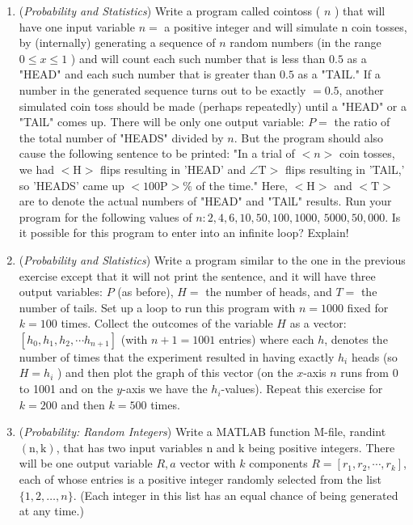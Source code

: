 \documentclass[../main.tex]{subfiles}
\begin{document}
\begin{enumerate}
 \item (\emph{Probability and Statistics}) Write a program called cointoss ( $n$ ) that will have one input variable $n=$ a positive integer and will simulate $\mathrm{n}$ coin tosses, by (internally) generating a sequence of $n$ random numbers (in the range $0 \leq x \leq 1$ ) and will count each such number that is less than $0.5$ as a "HEAD" and each such number that is greater than $0.5$ as a "TAIL." If a number in the generated sequence turns out to be exactly $=0.5$, another simulated coin toss should be made (perhaps repeatedly) until a "HEAD" or a "TAlL" comes up. There will be only one output variable: $P=$ the ratio of the total number of "HEADS" divided by $n$. But the program should also cause the following sentence to be printed: "In a trial of $<n>$ coin tosses, we had $<\mathrm{H}>$ flips resulting in 'HEAD' and $\angle \mathrm{T}>$ flips resulting in 'TAlL,' so 'HEADS' came up $<100 \mathrm{P}>\%$ of the time." Here, $<\mathrm{H}>$ and $<\mathrm{T}>$ are to denote the actual numbers of "HEAD" and "TAlL" results. Run your program for the following values of $n: 2,4,6,10,50,100,1000$, $5000,50,000$. Is it possible for this program to enter into an infinite loop? Explain!

\item (\emph{Probability and Slatistics}) Write a program similar to the one in the previous exercise except that it will not print the sentence, and it will have three output variables: $P$ (as before), $H=$ the number of heads, and $T=$ the number of tails. Set up a loop to run this program with $n=1000$ fixed for $k=100$ times. Collect the outcomes of the variable $H$ as a vector: $\left[h_{0}, h_{1}, h_{2}, \cdots h_{n+1}\right]$ (with $n+1=1001$ entries) where each $h$, denotes the number of times that the experiment resulted in having exactly $h_{i}$ heads (so $H=h_{i}$ ) and then plot the graph of this vector (on the $x$-axis $n$ runs from 0 to 1001 and on the $y$-axis we have the $h_{i}$-values). Repeat this exercise for $k=200$ and then $k=500$ times.

\item (\emph{Probability: Random Integers}) Write a MATLAB function M-file, randint $(\mathrm{n}, \mathrm{k})$, that has two input variables $\mathrm{n}$ and $\mathrm{k}$ being positive integers. There will be one output variable $R, a$ vector with $k$ components $R=\left[r_{1}, r_{2}, \cdots, r_{k}\right]$, each of whose entries is a positive integer randomly selected from the list $\{1,2, \ldots, n\}$. (Each integer in this list has an equal chance of being generated at any time.)


\end{enumerate}
\end{document}
